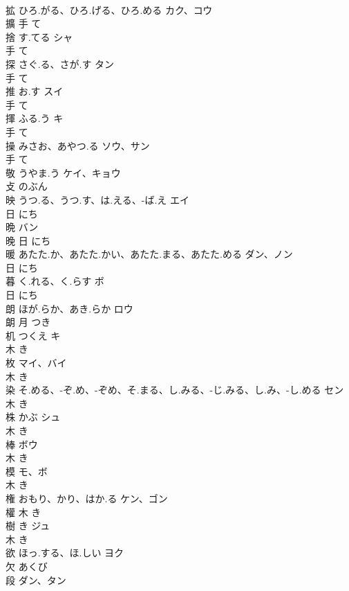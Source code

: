 \documentclass[8pt]{extreport}
\begin{document}
\begin{CJK}{UTF8}{min}
\\	拡	ひろ.がる、ひろ.げる、ひろ.める	カク、コウ	
\\	擴	手		て		
\\	捨	す.てる	シャ	
\\	手		て		
\\	探	さぐ.る、さが.す	タン	
\\	手		て		
\\	推	お.す	スイ	
\\	手		て		
\\	揮	ふる.う	キ	
\\	手		て		
\\	操	みさお、あやつ.る	ソウ、サン	
\\	手		て		
\\	敬	うやま.う	ケイ、キョウ	
\\	攴		のぶん		
\\	映	うつ.る、うつ.す、は.える、-ば.え	エイ	
\\	日		にち		
\\	晩		バン	
\\	晚	日		にち		
\\	暖	あたた.か、あたた.かい、あたた.まる、あたた.める	ダン、ノン	
\\	日		にち		
\\	暮	く.れる、く.らす	ボ	
\\	日		にち		
\\	朗	ほが.らか、あき.らか	ロウ	
\\	朗	月		つき		
\\	机	つくえ	キ	
\\	木		き		
\\	枚		マイ、バイ	
\\	木		き		
\\	染	そ.める、-ぞ.め、-ぞめ、そ.まる、し.みる、-じ.みる、し.み、-し.める	セン	
\\	木		き		
\\	株	かぶ	シュ	
\\	木		き		
\\	棒		ボウ	
\\	木		き		
\\	模		モ、ボ	
\\	木		き		
\\	権	おもり、かり、はか.る	ケン、ゴン	
\\	權	木		き		
\\	樹	き	ジュ	
\\	木		き		
\\	欲	ほっ.する、ほ.しい	ヨク	
\\	欠		あくび		
\\	段		ダン、タン	

\end{CJK}
\end{document}
